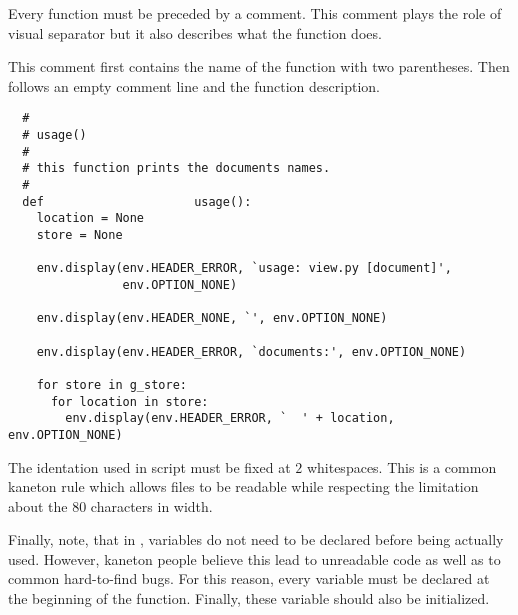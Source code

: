 Every function must be preceded by a comment. This comment plays the role
of visual separator but it also describes what the function does.

This comment first contains the name of the function with two parentheses.
Then follows an empty comment line and the function description.

\begin{verbatim}
  #
  # usage()
  #
  # this function prints the documents names.
  #
  def                     usage():
    location = None
    store = None

    env.display(env.HEADER_ERROR, `usage: view.py [document]',
                env.OPTION_NONE)

    env.display(env.HEADER_NONE, `', env.OPTION_NONE)

    env.display(env.HEADER_ERROR, `documents:', env.OPTION_NONE)

    for store in g_store:
      for location in store:
        env.display(env.HEADER_ERROR, `  ' + location, env.OPTION_NONE)
\end{verbatim}

The identation used in  script must be fixed at $2$
whitespaces. This is a common kaneton rule which allows files to be
readable while respecting the limitation about the $80$ characters
in width.

Finally, note, that in , variables do not need to be declared
before being actually used. However, kaneton people believe this lead
to unreadable code as well as to common hard-to-find bugs. For this reason,
every variable must be declared at the beginning of the function. Finally,
these variable should also be initialized.
